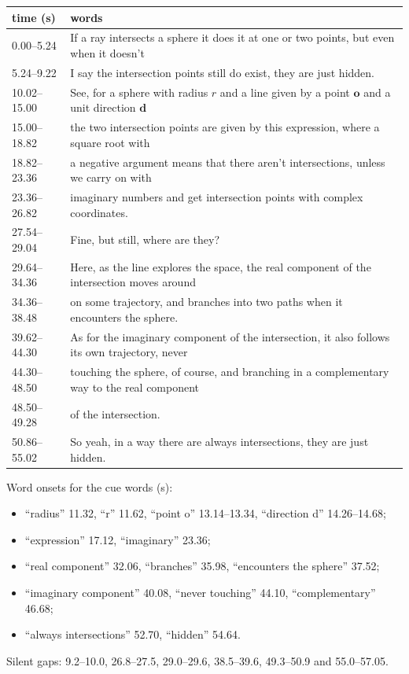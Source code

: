 \documentclass[10pt,a4paper]{article}
\newcommand{\vo}{\mathbf{o}}\newcommand{\vd}{\mathbf{d}}\newcommand{\vp}{\mathbf{p}}
\begin{document}
\begin{longtable}{@{}p{22mm}p{145mm}@{}}
\toprule
time (s) & words\\\midrule\endhead
0.00--5.24 & If a ray intersects a sphere it does it at one or two points, but even when it doesn't\\
5.24--9.22 & I say the intersection points still do exist, they are just hidden.\\
10.02--15.00 & See, for a sphere with radius $r$ and a line given by a point $\vo$ and a unit direction $\vd$\\
15.00--18.82 & the two intersection points are given by this expression, where a square root with\\
18.82--23.36 & a negative argument means that there aren't intersections, unless we carry on with\\
23.36--26.82 & imaginary numbers and get intersection points with complex coordinates.\\
27.54--29.04 & Fine, but still, where are they?\\
29.64--34.36 & Here, as the line explores the space, the real component of the intersection moves around\\
34.36--38.48 & on some trajectory, and branches into two paths when it encounters the sphere.\\
39.62--44.30 & As for the imaginary component of the intersection, it also follows its own trajectory, never\\
44.30--48.50 & touching the sphere, of course, and branching in a complementary way to the real component\\
48.50--49.28 & of the intersection.\\
50.86--55.02 & So yeah, in a way there are always intersections, they are just hidden.\\
\bottomrule
\end{longtable}

Word onsets for the cue words (s):
\begin{itemize}
\item ``radius'' 11.32, ``r'' 11.62, ``point o'' 13.14--13.34, ``direction d'' 14.26--14.68;
\item ``expression'' 17.12, ``imaginary'' 23.36;
\item ``real component'' 32.06, ``branches'' 35.98, ``encounters the sphere'' 37.52;
\item ``imaginary component'' 40.08, ``never touching'' 44.10, ``complementary'' 46.68;
\item ``always intersections'' 52.70, ``hidden'' 54.64.
\end{itemize}
Silent gaps: 9.2--10.0, 26.8--27.5, 29.0--29.6, 38.5--39.6, 49.3--50.9 and 55.0--57.05.
\end{document}
